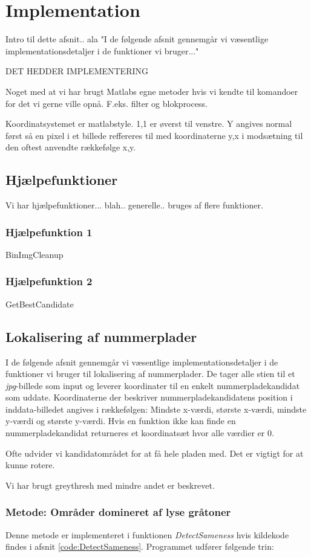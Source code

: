 \section{Implementation}
\label{sec:implementation}

Intro til dette afsnit.. ala "I de følgende afsnit gennemgår vi væsentlige implementationsdetaljer i de funktioner vi bruger..."

DET HEDDER IMPLEMENTERING

Noget med at vi har brugt Matlabs egne metoder hvis vi kendte til komandoer for det vi gerne ville opnå. F.eks. filter og blokprocess.

Koordinatsystemet er matlabstyle. 1,1 er øverst til venstre. Y angives normal først så en pixel i et billede reffereres til med koordinaterne y,x i modsætning til den oftest anvendte rækkefølge x,y. 

\subsection{Hjælpefunktioner}
Vi har hjælpefunktioner... blah.. generelle.. bruges af flere funktioner.
\subsubsection{Hjælpefunktion 1}
BinImgCleanup
\subsubsection{Hjælpefunktion 2}
GetBestCandidate

\subsection{Lokalisering af nummerplader}
I de følgende afsnit gennemgår vi væsentlige implementationsdetaljer i de funktioner vi bruger til lokalisering af nummerplader. De tager alle stien til et \textit{jpg}-billede som input og leverer koordinater til en enkelt nummerpladekandidat som uddate. Koordinaterne der beskriver nummerpladekandidatens position i inddata-billedet angives i rækkefølgen: Mindste x-værdi, største x-værdi, mindste y-værdi og største y-værdi. Hvis en funktion ikke kan finde en nummerpladekandidat returneres et koordinatsæt hvor alle værdier er 0.

Ofte udvider vi kandidatområdet for at få hele pladen med. Det er vigtigt for at kunne rotere.

Vi har brugt greythresh med mindre andet er beskrevet.
\subsubsection{Metode: Områder domineret af lyse gråtoner}
Denne metode er implementeret i funktionen \textit{DetectSameness} hvis kildekode findes i afsnit \vref{code:DetectSameness}. Programmet udfører følgende trin:


